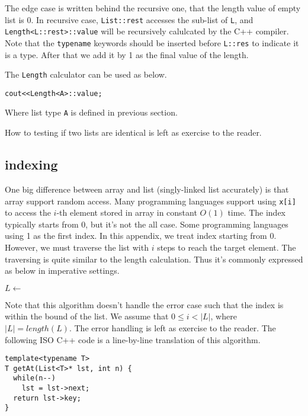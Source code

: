 \documentclass{article}
\begin{document}
The edge case is written behind the recursive one, that the length value of empty list is 0.
In recursive case, \verb|List::rest| accesses the sub-list of \verb|L|, and \verb|Length<L::rest>::value|
will be recursively calulcated by the C++ compiler. Note that the \verb|typename| keywords should
be inserted before \verb|L::res| to indicate it is a type. After that we add it by 1 as the final
value of the length.

The \verb|Length| calculator can be used as below.

\begin{lstlisting}
cout<<Length<A>::value;
\end{lstlisting}

Where list type \verb|A| is defined in previous section.

How to testing if two lists are identical is left as exercise to the reader.

\subsection{indexing}

One big difference between array and list (singly-linked list accurately) is that array support
random access. Many programming languages support using \verb|x[i]| to access the $i$-th element
stored in array in constant $O(1)$ time. The index typically starts from 0, but it's not the all case.
Some programming languages using 1 as the first index. In this appendix, we treat index starting
from 0. However, we must traverse the list with
$i$ steps to reach the target element. The traversing is quite similar to the length calculation.
Thus it's commonly expressed as below in imperative settings.

\begin{algorithmic}
    \State $L \gets $ 
  \EndWhile
  \State \Return {}
\EndFunction
\end{algorithmic}

Note that this algorithm doesn't handle the error case such that the index is within the bound
of the list. We assume that $0 \leq i < |L|$, where $|L| = length(L)$. The error handling is left
as exercise to the reader. The following ISO C++ code is a line-by-line translation of this
algorithm.

\lstset{language=C++}
\begin{lstlisting}
template<typename T>
T getAt(List<T>* lst, int n) {
  while(n--)
    lst = lst->next;
  return lst->key;
}
\end{lstlisting}
\end{document}
